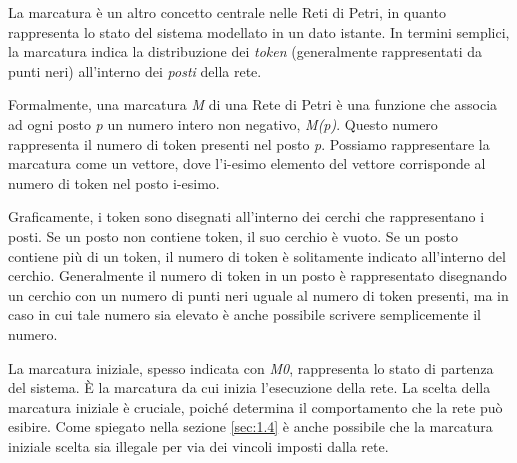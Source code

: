 La marcatura è un altro concetto centrale nelle Reti di Petri, in quanto rappresenta lo stato del sistema modellato in un dato istante. In termini semplici, la marcatura indica la distribuzione dei \textit{token} (generalmente rappresentati da punti neri) all'interno dei \textit{posti} della rete.

Formalmente, una marcatura \textit{M} di una Rete di Petri è una funzione che associa ad ogni posto \textit{p} un numero intero non negativo, \textit{M(p)}. Questo numero rappresenta il numero di token presenti nel posto \textit{p}. Possiamo rappresentare la marcatura come un vettore, dove l'i-esimo elemento del vettore corrisponde al numero di token nel posto i-esimo.

Graficamente, i token sono disegnati all'interno dei cerchi che rappresentano i posti. Se un posto non contiene token, il suo cerchio è vuoto. Se un posto contiene più di un token, il numero di token è solitamente indicato all'interno del cerchio. Generalmente il numero di token in un posto è rappresentato disegnando un cerchio con un numero di punti neri uguale al numero di token presenti, ma in caso in cui tale numero sia elevato è anche possibile scrivere semplicemente il numero.

La marcatura iniziale, spesso indicata con \textit{M0}, rappresenta lo stato di partenza del sistema. È la marcatura da cui inizia l'esecuzione della rete. La scelta della marcatura iniziale è cruciale, poiché determina il comportamento che la rete può esibire. Come spiegato nella sezione \ref{sec:1.4} è anche possibile che la marcatura iniziale scelta sia illegale per via dei vincoli imposti dalla rete.